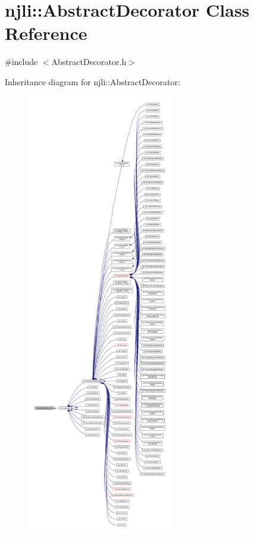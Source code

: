 \hypertarget{classnjli_1_1_abstract_decorator}{}\section{njli\+:\+:Abstract\+Decorator Class Reference}
\label{classnjli_1_1_abstract_decorator}


{\ttfamily \#include $<$Abstract\+Decorator.\+h$>$}



Inheritance diagram for njli\+:\+:Abstract\+Decorator\+:\nopagebreak
\begin{figure}[H]
\begin{center}
\leavevmode
\includegraphics[height=550pt]{classnjli_1_1_abstract_decorator__inherit__graph}
\end{center}
\end{figure}


